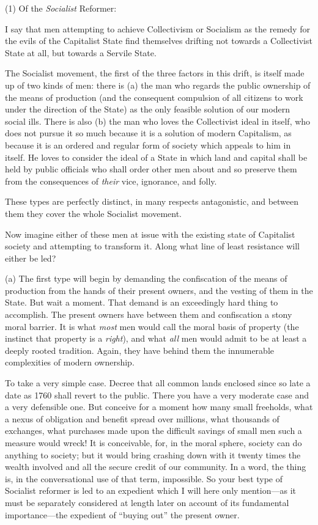 \documentclass{book}
\begin{document}
(1) Of the \emph{Socialist} Reformer:

I say that men attempting to achieve Collectivism or Socialism as the remedy for the evils of the Capitalist State find themselves drifting not towards a Collectivist State at all, but towards a Servile State.

The Socialist movement, the first of the three factors in this drift, is itself made up of two kinds of men: there is (a) the man who regards the public ownership of the means of production (and the consequent compulsion of all citizens to work under the direction of the State) as the only feasible solution of our modern social ills. There is also (b) the man who loves the Collectivist ideal in itself, who does not pursue it so much because it is a solution of modern Capitalism, as because it is an ordered and regular form of society which appeals to him in itself. He loves to consider the ideal of a State in which land and capital shall be held by public officials who shall order other men about and so preserve them from the consequences of \emph{their} vice, ignorance, and folly.

These types are perfectly distinct, in many respects antagonistic, and between them they cover the whole Socialist movement.

Now imagine either of these men at issue with the existing state of Capitalist society and attempting to transform it. Along what line of least resistance will either be led?

(a) The first type will begin by demanding the confiscation of the means of production from the hands of their present owners, and the vesting of them in the State. But wait a moment. That demand is an exceedingly hard thing to accomplish. The present owners have between them and confiscation a stony moral barrier. It is what \emph{most} men would call the moral basis of property (the instinct that property is a \emph{right}), and what \emph{all} men would admit to be at least a deeply rooted tradition. Again, they have behind them the innumerable complexities of modern ownership.

To take a very simple case. Decree that all common lands enclosed since so late a date as 1760 shall revert to the public. There you have a very moderate case and a very defensible one. But conceive for a moment how many small freeholds, what a nexus of obligation and benefit spread over millions, what thousands of exchanges, what purchases made upon the difficult savings of small men such a measure would wreck! It is conceivable, for, in the moral sphere, society can do anything to society; but it would bring crashing down with it twenty times the wealth involved and all the secure credit of our community. In a word, the thing is, in the conversational use of that term, impossible. So your best type of Socialist reformer is led to an expedient which I will here only mention—as it must be separately considered at length later on account of its fundamental importance—the expedient of “buying out” the present owner.
\end{document}
